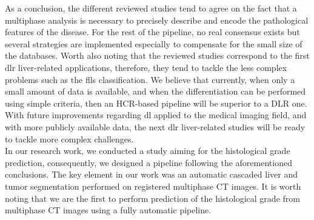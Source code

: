 As a conclusion, the different reviewed studies tend to agree on the
fact that a multiphase analysis is necessary to precisely describe and
encode the pathological features of the disease. For the rest of the
pipeline, no real consensus exists but several strategies are
implemented especially to compensate for the small size of the
databases. Worth also noting that the reviewed studies correspond to the
first \ac{dlr} liver-related applications, therefore, they tend to tackle the
less complex problems such as the \ac{fll}s classification. We believe that currently, when only a small amount of data is available, and when the differentiation can be performed using simple criteria, then an HCR-based pipeline will be superior to a DLR one. With future
improvements regarding \ac{dl} applied to the medical imaging field, and with more publicly available data, the next \ac{dlr} liver-related studies will be ready to tackle more complex challenges.\\
In our research work, we conducted a study aiming for the histological grade prediction, 
consequently, we designed a pipeline following the aforementioned conclusions. 
The key element in our work was an automatic cascaded liver and tumor segmentation performed on registered multiphase CT images. It is worth noting that we are the first to perform prediction of the histological grade from multiphase CT images using a fully automatic pipeline. 
